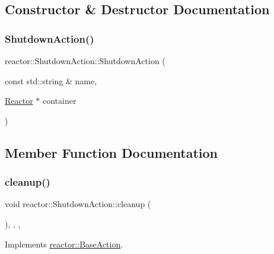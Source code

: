 \subsection{Constructor \& Destructor Documentation}
\mbox{\label{classreactor_1_1ShutdownAction_a9b0444bd81eaca6f1b51f484ee0b95b2}} 
\subsubsection{\texorpdfstring{Shutdown\+Action()}{ShutdownAction()}}
{\footnotesize\ttfamily reactor\+::\+Shutdown\+Action\+::\+Shutdown\+Action (\begin{DoxyParamCaption}\item[{const std\+::string \&}]{name,  }\item[{\hyperlink{classreactor_1_1Reactor}{Reactor} $\ast$}]{container }\end{DoxyParamCaption})\hspace{0.3cm}{\ttfamily [inline]}}



\subsection{Member Function Documentation}
\mbox{\label{classreactor_1_1ShutdownAction_acbea47c7b7efb26cd10d6ac8c781901a}} 
\subsubsection{\texorpdfstring{cleanup()}{cleanup()}}
{\footnotesize\ttfamily void reactor\+::\+Shutdown\+Action\+::cleanup (\begin{DoxyParamCaption}{ }\end{DoxyParamCaption})\hspace{0.3cm}{\ttfamily [inline]}, {\ttfamily [final]}, {\ttfamily [override]}, {\ttfamily [virtual]}}



Implements \hyperlink{classreactor_1_1BaseAction_a7e4ad7157e653054c7afa22b78e46923}{reactor\+::\+Base\+Action}.

